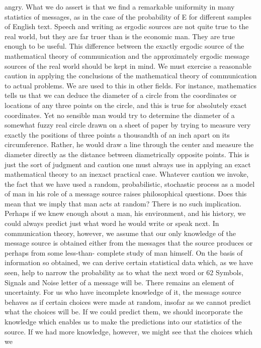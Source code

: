 angry. What we do assert is that we find a remarkable uniformity
in many statistics of messages, as in the case of the probability of
E for different samples of English text. Speech and writing as
ergodic sources are not quite true to the real world, but they are
far truer than is the economic man. They are true enough to be
useful.
This difference between the exactly ergodic source of the mathematical
theory of communication and the approximately ergodic
message sources of the real world should be kept in mind. We must
exercise a reasonable caution in applying the conclusions of the
mathematical theory of communication to actual problems. We are
used to this in other fields. For instance, mathematics tells us that
we can deduce the diameter of a circle from the coordinates or
locations of any three points on the circle, and this is true for
absolutely exact coordinates. Yet no sensible man would try to
determine the diameter of a somewhat fuzzy real circle drawn on
a sheet of paper by trying to measure very exactly the positions of
three points a thousandth of an inch apart on its circumference.
Rather, he would draw a line through the center and measure the
diameter directly as the distance between diametrically opposite
points. This is just the sort of judgment and caution one must
always use in applying an exact mathematical theory to an inexact
practical case.
Whatever caution we invoke, the fact that we have used a random,
probabilistic, stochastic process as a model of man in his role
of a message source raises philosophical questions. Does this mean
that we imply that man acts at random? There is no such implication.
Perhaps if we knew enough about a man, his environment,
and his history, we could always predict just what word he would
write or speak next.
In communication theory, however, we assume that our only
knowledge of the message source is obtained either from the
messages that the source produces or perhaps from some less-than-
complete study of man himself. On the basis of information so
obtained, we can derive certain statistical data which, as we have
seen, help to narrow the probability as to what the next word or
62
Symbols, Signals and Noise
letter of a message will be. There remains an element of uncertainty.
For us who have incomplete knowledge of it, the message
source behaves as if certain choices were made at random, insofar
as we cannot predict what the choices will be. If we could predict
them, we should incorporate the knowledge which enables us to
make the predictions into our statistics of the source. If we had
more knowledge, however, we might see that the choices which we
